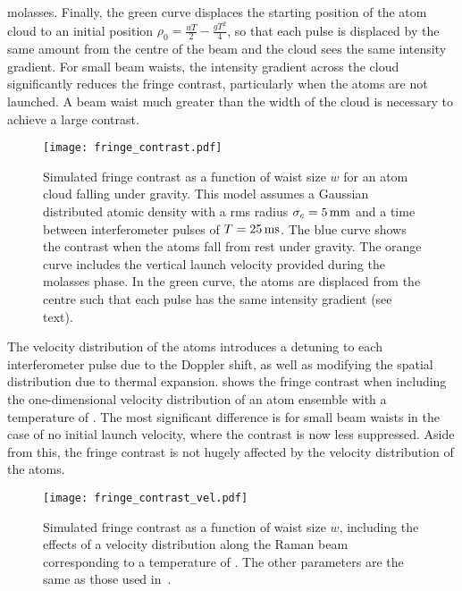 molasses. Finally, the green curve displaces the starting position of
the atom cloud to an initial position $\rho_0 = \frac{u T}{2} - \frac{g
T^2}{4}$, so that each pulse is displaced by the same amount from the
centre of the beam and the cloud sees the same intensity gradient. For small beam waists, the intensity
gradient across the cloud significantly reduces the fringe contrast,
particularly when the atoms are not launched. A beam waist much greater than the width of the cloud is necessary to achieve a
large contrast. 
\begin{figure}[!htbp]
	\centering
	\texttt{[image: fringe\_contrast.pdf]}
	\caption[Simulated fringe contrast vs beam waist size]{Simulated fringe
		contrast as a function of waist size \(w\) for an atom cloud falling under
		gravity. This model assumes a Gaussian distributed atomic density
    with a rms radius \(\sigma_c = \sivalue{5}{\milli\metre}\) and a time between
		interferometer pulses of \(T = \sivalue{25}{\milli\second}\). The
    blue curve shows the contrast when the atoms fall from rest under gravity.
    The orange curve includes the vertical launch velocity provided
    during the molasses phase. In the green curve, the atoms are
    displaced from the centre such that each pulse has the same
  intensity gradient (see text).} 
	\label{fig:raman_fringecontrast}
\end{figure}
\par\noindent
The velocity distribution of the atoms introduces a detuning to each
interferometer pulse due to the Doppler shift, as well as modifying
the spatial distribution due to thermal expansion.
 shows the fringe contrast when including the
one-dimensional velocity distribution of an atom ensemble with a
temperature of . The most significant difference is
for small beam waists in
the case of no initial launch velocity, where the contrast is now less
suppressed. Aside from this, the fringe contrast is not hugely
affected by the velocity distribution of the atoms. 
\begin{figure}[htpb]
  \centering
  \texttt{[image: fringe\_contrast\_vel.pdf]}
  \caption[Simulated fringe contrast vs beam waist size including a
  thermal velocity distribution.]{Simulated fringe contrast as a function of waist size $w$,
  including the effects of a velocity distribution along the Raman
beam corresponding to a temperature of . The other
parameters are the same as those used
in~.}
  \label{fig:phase_vel}
\end{figure}
